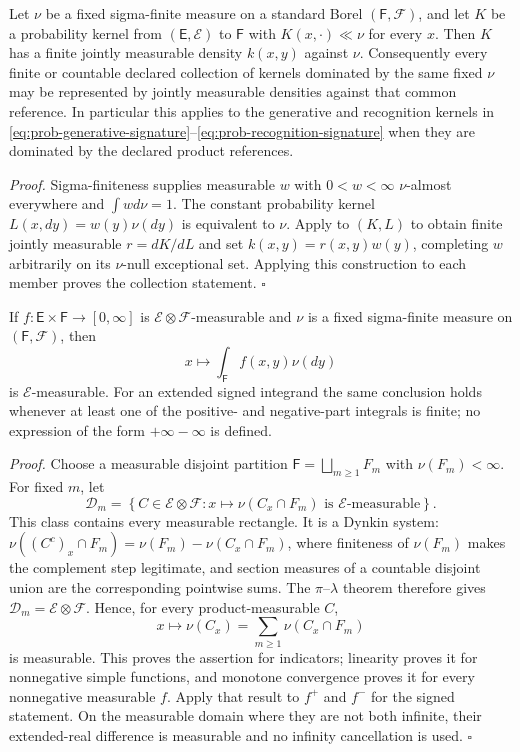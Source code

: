 \medskip
{}
Let $\nu$ be a fixed sigma-finite measure on a standard Borel $(\mathsf F,\mathscr F)$, and let $K$ be a probability kernel from $(\mathsf E,\mathscr E)$ to $\mathsf F$ with $K(x,\cdot)\ll\nu$ for every $x$. Then $K$ has a finite jointly measurable density $k(x,y)$ against $\nu$. Consequently every finite or countable declared collection of kernels dominated by the same fixed $\nu$ may be represented by jointly measurable densities against that common reference. In particular this applies to the generative and recognition kernels in \eqref{eq:prob-generative-signature}--\eqref{eq:prob-recognition-signature} when they are dominated by the declared product references. 
\medskip

\noindent\emph{Proof.} Sigma-finiteness supplies measurable $w$ with $0<w<\infty$ $\nu$-almost everywhere and $\int w d\nu=1$. The constant probability kernel $L(x,dy)=w(y)\nu(dy)$ is equivalent to $\nu$. Apply  to $(K,L)$ to obtain finite jointly measurable $r=dK/dL$ and set $k(x,y)=r(x,y)w(y)$, completing $w$ arbitrarily on its $\nu$-null exceptional set. Applying this construction to each member proves the collection statement. \hfill$\square$

\medskip
{}
If $f:\mathsf E\times\mathsf F\to[0,\infty]$ is $\mathscr E\otimes\mathscr F$-measurable and $\nu$ is a fixed sigma-finite measure on $(\mathsf F,\mathscr F)$, then
\[
x\longmapsto\int_{\mathsf F}f(x,y)\nu(dy)
\]
is $\mathscr E$-measurable.  For an extended signed integrand the same conclusion holds whenever at least one of the positive- and negative-part integrals is finite; no expression of the form $+\infty-\infty$ is defined. 
\medskip

\noindent\emph{Proof.} Choose a measurable disjoint partition
$\mathsf F=\bigsqcup_{m\geq1}F_m$ with $\nu(F_m)<\infty$.  For fixed $m$, let
\[
 \mathscr D_m=\left\{C\in\mathscr E\otimes\mathscr F:
 x\longmapsto\nu(C_x\cap F_m)\text{ is }\mathscr E\text{-measurable}\right\}.
\]
This class contains every measurable rectangle.  It is a Dynkin system:
$\nu((C^c)_x\cap F_m)=\nu(F_m)-\nu(C_x\cap F_m)$, where finiteness of
$\nu(F_m)$ makes the complement step legitimate, and section measures of a
countable disjoint union are the corresponding pointwise sums.  The
$\pi$--$\lambda$ theorem therefore gives
$\mathscr D_m=\mathscr E\otimes\mathscr F$.  Hence, for every product-measurable
$C$,
\[
 x\longmapsto\nu(C_x)=\sum_{m\geq1}\nu(C_x\cap F_m)
\]
is measurable.  This proves the assertion for indicators; linearity proves it
for nonnegative simple functions, and monotone convergence proves it for every
nonnegative measurable $f$.  Apply that result to $f^+$ and $f^-$ for the
signed statement.  On the measurable domain where they are not both infinite,
their extended-real difference is measurable and no infinity cancellation is
used. \hfill$\square$

